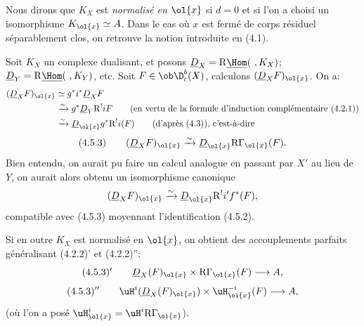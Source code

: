 Nous dirons que $K_X$ est \emph{normalisé en $\ol{x}$} si $d=0$ et si l'on a choisi un isomorphisme $K_{\ol{x}}\simeq A$. Dans le cas où $x$ est fermé de corps résiduel séparablement clos, on retrouve la notion introduite en (4.1).

Soit $K_X$ un complexe dualisant, et posons $\underline{D}_X=\mathrm{R}\underline{\Hom}(\ ,K_X)$; $\underline{D}_Y=\mathrm{R}\underline{\Hom}(\ ,K_Y)$, etc. Soit $F\in\ob\D_c^b(X)$, calculons $(\underline{D}_XF)_{\ol{x}}$. On a:
\[
\begin{aligned}
(\underline{D}_XF)_{\ol{x}}&\simeq g^*i^*\underline{D}_X F\\
&\xrightarrow{\sim}g^*\underline{D}_Y\mathrm{R}^{!}iF\qquad\text{(en vertu de la formule d'induction complémentaire (4.2.1))}\\
&\xrightarrow{\sim}\underline{D}_{\ol{x}}g^*\mathrm{R}^{!}i(F)\qquad\text{(d'après (4.3)), c'est-à-dire}
\end{aligned}
\]
\[
(4.5.3)\qquad (\underline{D}_X F)_{\ol{x}}\xrightarrow{\sim}\underline{D}_{\ol{x}}\mathrm{R}\Gamma_{\ol{x}}(F).
\]
Bien entendu, on aurait pu faire un calcul analogue en passant par 
$X'$ au
lieu de $Y$, on aurait alors obtenu un isomorphisme canonique
\[
(\underline{D}_XF)_{\ol{x}}\xrightarrow{\sim}\underline{D}_{\ol{x}}\mathrm{R}^{!}i'f^*(F),
\]
compatible avec (4.5.3) moyennant l'identification (4.5.2).

Si en outre $K_X$ est normalisé en $\ol{x}$, on obtient des accouplements parfaits généralisant (4.2.2)' et (4.2.2)'':
\[
(4.5.3)'\qquad \underline{D}_X(F)_{\ol{x}}\times \mathrm{R}\Gamma_{\ol{x}}(F)\longrightarrow A,
\]
\[
(4.5.3)''\qquad \uH^i(\underline{D}_X(F)_{\ol{x}})\times \uH_{\ol{x}}^{-i}(F)\longrightarrow A,
\]
(où l'on a posé $\uH_{\ol{x}}^i=\uH^i\mathrm{R}\Gamma_{\ol{x}}$).

